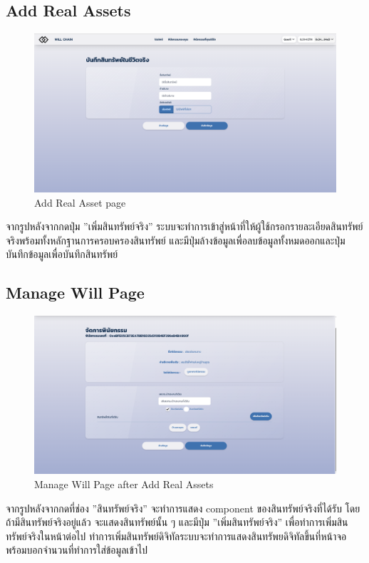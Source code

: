 \documentclass[12pt,oneside,openright,a4paper]{cpe-thai-project}
\begin{document}
\clearpage
\subsection{Add Real Assets }
	\begin{figure}[!thb]
			\centering
			\includegraphics[scale=0.2]{Addwillpage}
			\caption{Add Real Asset page}
		\end{figure}
		\FloatBarrier
\tab จากรูปหลังจากกดปุ่ม ''เพิ่มสินทรัพย์จริง'' ระบบจะทำการเข้าสู่หน้าที่ให้ผู้ใช้กรอกรายละเอียดสินทรัพย์จริงพร้อมทั้งหลักฐานการครอบครองสินทรัพย์ และมีปุ่มล้างข้อมูลเพื่อลบข้อมูลทั้งหมดออกและปุ่มบันทึกข้อมูลเพื่อบันทึกสินทรัพย์

\subsection{Manage Will Page }
	\begin{figure}[!thb]
			\centering
			\includegraphics[scale=0.2]{manageWillRealAsset4}
			\caption{Manage Will Page after Add Real Assets }
		\end{figure}
		\FloatBarrier
\tab จากรูปหลังจากกดที่ช่อง ''สินทรัพย์จริง'' จะทำการแสดง component ของสินทรัพย์จริงที่ได้รับ โดยถ้ามีสินทรัพย์จริงอยู่แล้ว จะแสดงสินทรัพย์นั้น ๆ และมีปุ่ม ''เพิ่มสินทรัพย์จริง'' เพื่อทำการเพิ่มสินทรัพย์จริงในหน้าต่อไป
ทำการเพิ่มสินทรัพย์ดิจิทัลระบบจะทำการแสดงสินทรัพยดิจิทัลขึ้นที่หน้าจอพร้อมบอกจำนวนที่ทำการใส่ข้อมูลเข้าไป
\end{document}
